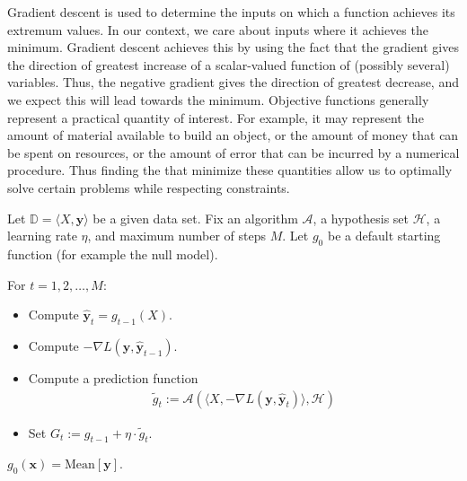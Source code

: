 \documentclass[12pt]{article}
\begin{document}
\begin{enumerate}

Gradient descent is used to determine the inputs on which a function achieves its
extremum values. In our context, we care about inputs where it achieves the minimum.
Gradient descent achieves this by using the fact that the gradient gives the direction
of greatest increase of a scalar-valued function of (possibly several) variables.
Thus, the negative gradient gives the direction of greatest decrease, and
we expect this will lead towards the minimum. Objective functions generally represent
a practical quantity of interest. For example, it may represent the amount of
material available to build an object, or the amount of money that can be spent
on resources, or the amount of error that can be incurred by a numerical procedure.
Thus finding the that minimize these quantities allow us to optimally solve certain
problems while respecting constraints.


Let $\mathbb{D} = \langle X, \bm{y}\rangle$ be a given data set.
Fix an algorithm $\mathcal{A}$, a hypothesis set $\mathcal{H}$, a learning rate
$\eta$, and maximum number of steps $M$. Let $g_0$ be a default starting function
(for example the null model).

For $t = 1,2,\ldots,M$:
\begin{itemize}
	\item Compute $\hat{\bm{y}}_t = g_{t-1}(X)$.
	\item Compute $-\nabla L(\bm{y}, \hat{\bm{y}}_{t-1})$.
	\item Compute a prediction function
	\begin{align*}
		\tilde{g}_t := \mathcal{A}(\langle X, -\nabla L(\bm{y}, \hat{\bm{y}}_t)\rangle, \mathcal{H})
	\end{align*}
	\item Set $G_t := g_{t-1} + \eta \cdot \tilde{g}_t$.
\end{itemize}


$g_0(\bm{x}) = \text{Mean}[\bm{y}]$.


\end{enumerate}
\end{document}
